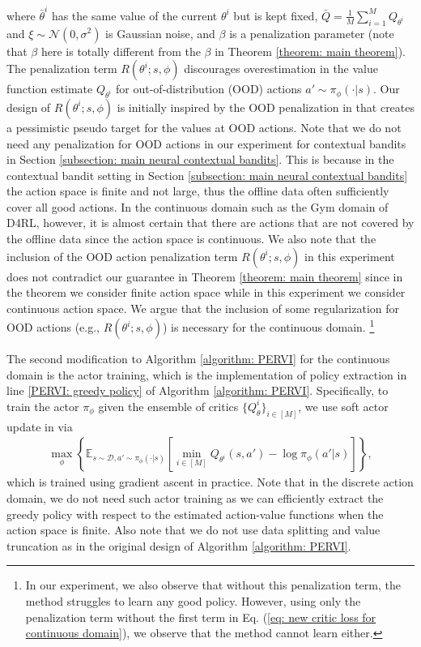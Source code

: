 \documentclass{article} \usepackage{iclr2023/iclr2023_conference,times}
\def\gD{{\mathcal{D}}}
\def\gN{{\mathcal{N}}}
\begin{document}
where $\bar{\theta}^i$ has the same value of the current $\theta^i$ but is kept fixed, $\bar{Q} = \frac{1}{M} \sum_{i=1}^M Q_{\theta^i}$ and $\xi \sim \gN(0, \sigma^2)$ is Gaussian noise, and $\beta$ is a penalization parameter (note that $\beta$ here is totally different from the $\beta$ in Theorem \ref{theorem: main theorem}). The penalization term $R(\theta^i; s, \phi)$ discourages overestimation in the value function estimate $Q_{\theta^i}$ for out-of-distribution (OOD) actions $a' \sim \pi_{\phi}(\cdot|s)$. Our design of $R(\theta^i; s, \phi)$ is initially inspired by the OOD penalization in \cite{bai2022pessimistic} that creates a pessimistic pseudo target for the values at OOD actions. Note that we do not need any penalization for OOD actions in our experiment for contextual bandits in Section \ref{subsection: main neural contextual bandits}. This is because in the contextual bandit setting in Section \ref{subsection: main neural contextual bandits} the action space is finite and not large, thus the offline data often sufficiently cover all good actions. In the continuous domain such as the Gym domain of D4RL, however, it is almost certain that there are actions that are not covered by the offline data since the action space is continuous. We also note that the inclusion of the OOD action penalization term $R(\theta^i; s, \phi)$ in this experiment does not contradict our guarantee in Theorem \ref{theorem: main theorem} since in the theorem we consider finite action space while in this experiment we consider continuous action space.  We argue that the inclusion of some regularization for OOD actions (e.g., $R(\theta^i; s, \phi)$) is necessary for the continuous domain. \footnote{In our experiment, we also observe that without this penalization term, the method struggles to learn any good policy. However, using only the penalization term without the first term in Eq. (\ref{eq: new critic loss for continuous domain}), we observe that the method cannot learn either.}



The second modification to Algorithm \ref{algorithm: PERVI} for the continuous domain is the actor training, which is the implementation of policy extraction in line \ref{PERVI: greedy policy}  of Algorithm \ref{algorithm: PERVI}. Specifically, to train the actor $\pi_{\phi}$ given the ensemble of critics $\{{Q}_{\theta}^i\}_{i \in [M]}$,  we use soft actor update in \cite{haarnoja2018soft} via
\begin{align}
    \max_{\phi} \left\{ \mathbb{E}_{s \sim \gD, a' \sim \pi_{\phi}(\cdot|s)} \left[ \min_{i \in [M]} Q_{\theta^i}(s,a') - \log \pi_{\phi}(a'|s) \right] \right\},
\end{align}
which is trained using gradient ascent in practice. Note that in the discrete action domain, we do not need such actor training as we can efficiently extract the greedy policy with respect to the estimated action-value functions when the action space is finite. Also note that we do not use data splitting and value truncation as in the original design of Algorithm \ref{algorithm: PERVI}. 
\end{document}
